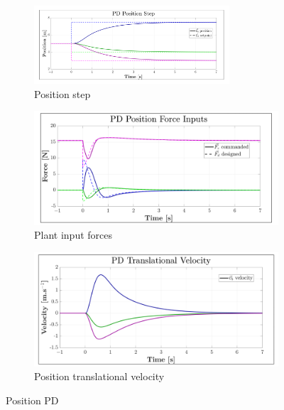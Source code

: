 \begin{figure}[htbp]
\vspace{-6pt}
\centering
\begin{subfigure}{\textwidth}
\centering
\includegraphics[width=0.8\textwidth]{graphs/PD_Position_Step}
\vspace{-6pt}
\caption{Position step}
\label{fig:PD_Position_Step}
\end{subfigure}
\begin{subfigure}{0.49\textwidth}
\centering
\includegraphics[width=\textwidth]{graphs/PD_Position_Force}
\caption{Plant input forces}
\label{fig:PD_Position_Force}
\end{subfigure}
\begin{subfigure}{0.49\textwidth}
\centering
\includegraphics[width=\textwidth]{graphs/PD_Position_Velocity}
\caption{Position translational velocity}
\label{fig:PD_Position_Velocity}
\end{subfigure}
\caption{Position PD}
\vspace{-24pt}
\end{figure}
